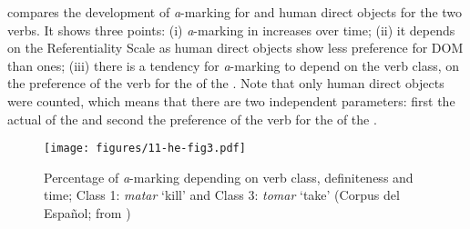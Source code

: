 \documentclass[output=paper]{LSP/langsci}
\begin{document}
\begin{table}
\caption{Percentage of \textit{a}-marking of human definite direct objects. (Corpus del Español, from \citealt[608]{vonHeusingeretal2011Affectedness})}
\label{11-he-tab:4}
\end{table}

\begin{table}
\caption{Percentage of \textit{a}-marking of human indefinite direct objects (Corpus del Español; from \citealt{vonHeusingeretal2011Affectedness}: 608) }
\label{11-he-tab:5}
\end{table}

 compares the development of \textit{a}-marking for  and  human direct objects for the two verbs. It shows three points: (i) \textit{a}-marking in  increases over time; (ii) it depends on the Referentiality Scale as human  direct objects show less preference for DOM than  ones; (iii) there is a tendency for \textit{a}-marking to depend on the verb class, \ie on the preference of the verb for the  of the . Note that only human direct objects were counted, which means that there are two independent parameters: first the actual  of the  and second the preference of the verb for the  of the . 

\begin{figure}%
	\centering
	\texttt{[image: figures/11-he-fig3.pdf]} %
\caption{Percentage of\textit{ a}{}-marking depending on verb class, definiteness and time; Class 1: \textit{matar} ‘kill’ and Class 3: \textit{tomar} ‘take’ (Corpus del Español; from \citealt[606]{vonHeusingeretal2011Affectedness})} \label{11-he-fig:3}
\end{figure}
\end{document}
